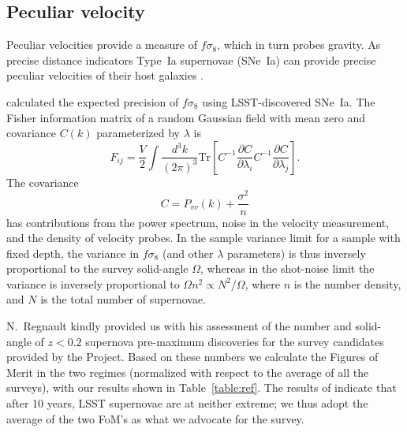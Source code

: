 \subsection{Peculiar velocity}


Peculiar velocities provide a measure of $f\sigma_8$, which in turn probes gravity.  As precise distance indicators Type~Ia supernovae (SNe~Ia)
can provide precise peculiar velocities of their host galaxies \citep{2006PhRvD..73l3526H,2011ApJ...741...67D}.

\citet{2017ApJ...847..128H} calculated the  expected precision of $f\sigma_8$ using LSST-discovered SNe~Ia.
The Fisher information matrix of a random Gaussian field with mean zero and covariance $C(k)$ parameterized by $\lambda$ is
\begin{equation}
F_{ij} = \frac{V}{2}\int \frac{d^3k}{(2\pi)^3} \text{Tr}\left[ C^{-1} \frac{\partial C}{\partial \lambda_i} C^{-1}
\frac{\partial C}{\partial \lambda_j} \right].
\end{equation}
The covariance
\begin{equation}
C = P_{vv}(k) + \frac{\sigma^2}{n}
\end{equation}
has contributions from the power spectrum, noise in the velocity measurement, and the density of velocity probes.
In the sample variance limit for a sample with fixed depth, the variance in $f\sigma_8$ (and other $\lambda$ parameters)
is thus inversely proportional to the survey solid-angle $\Omega$, whereas
in the shot-noise limit the variance is inversely proportional to $\Omega n^2 \propto N^2/\Omega$, where $n$ is the number density,
and $N$ is the total number of supernovae.  


N.~Regnault kindly provided us with his assessment of the number and solid-angle of $z<0.2$ supernova pre-maximum discoveries 
for the survey candidates provided by the Project.  Based on these numbers we calculate the Figures of Merit in the two regimes 
(normalized with respect to the average of all the surveys),
with our results shown in 
Table~\ref{table:ref}.  The results of \citet{2017ApJ...847..128H}  indicate that after 10 years,
LSST supernovae are at neither extreme; we thus adopt the average of the two FoM's as what we advocate for the survey.


